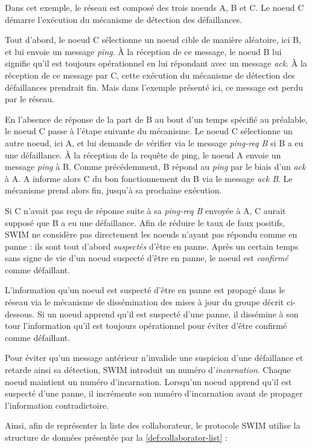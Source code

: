 Dans cet exemple, le réseau est composé des trois noeuds A, B et C.
Le noeud C démarre l'exécution du mécanisme de détection des défaillances.

Tout d'abord, le noeud C sélectionne un noeud cible de manière aléatoire, ici B, et lui envoie un message \emph{ping}.
À la réception de ce message, le noeud B lui signifie qu'il est toujours opérationnel en lui répondant avec un message \emph{ack}.
À la réception de ce message par C, cette exécution du mécanisme de détection des défaillances prendrait fin.
Mais dans l'exemple présenté ici, ce message est perdu par le réseau.

En l'absence de réponse de la part de B au bout d'un temps spécifié au préalable, le noeud C passe à l'étape suivante du mécanisme.
Le noeud C sélectionne un autre noeud, ici A, et lui demande de vérifier via le message \emph{ping-req B} si B a eu une défaillance.
À la réception de la requête de ping, le noeud A envoie un message \emph{ping} à B.
Comme précédemment, B répond au \emph{ping} par le biais d'un \emph{ack} à A.
A informe alors C du bon fonctionnement du B via le message \emph{ack B}.
Le mécanisme prend alors fin, jusqu'à sa prochaine exécution.

Si C n'avait pas reçu de réponse suite à sa \emph{ping-req B} envoyée à A, C aurait supposé que B a eu une défaillance.
Afin de réduire le taux de faux positifs, SWIM ne considère pas directement les noeuds n'ayant pas répondu comme en panne : ils sont tout d'abord \emph{suspectés} d'être en panne.
Après un certain temps sans signe de vie d'un noeud suspecté d'être en panne, le noeud est \emph{confirmé} comme défaillant.

L'information qu'un noeud est suspecté d'être en panne est propagé dans le réseau via le mécanisme de dissémination des mises à jour du groupe décrit ci-dessous.
Si un noeud apprend qu'il est suspecté d'une panne, il dissémine à son tour l'information qu'il est toujours opérationnel pour éviter d'être confirmé comme défaillant.

Pour éviter qu'un message antérieur n'invalide une suspicion d'une défaillance et retarde ainsi sa détection, SWIM introduit un numéro d'\emph{incarnation}.
Chaque noeud maintient un numéro d'incarnation.
Lorsqu'un noeud apprend qu'il est suspecté d'une panne, il incrémente son numéro d'incarnation avant de propager l'information contradictoire.

Ainsi, afin de représenter la liste des collaborateur, le protocole SWIM utilise la structure de données présentée par la \autoref{def:collaborator-list} :

